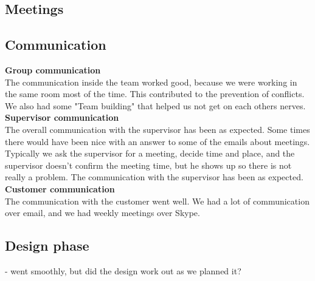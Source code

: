     \subsection{Meetings}
    \subsection{Communication}
    
        \indent \indent \textbf{Group communication} \\
        The communication inside the team worked good, because we were working in the same room most of the time. This contributed to the prevention of conflicts. We also had some "Team building" that helped us not get on each others nerves. 
        \\
        
        \textbf{Supervisor communication} \\
        The overall communication with the supervisor has been as expected. Some times there would have been nice with an answer to some of the emails about meetings. Typically we ask the supervisor for a meeting, decide time and place, and the supervisor doesn't confirm the meeting time, but he shows up so there is not really a problem. 
        The communication with the supervisor has been as expected. 
        \\ 
        
        \textbf{Customer communication} \\
        The communication with the customer went well. We had a lot of communication over email, and we had weekly meetings over Skype. 
        \\
        
        
    \subsection{Design phase} - went smoothly, but did the design work out as we planned it?
